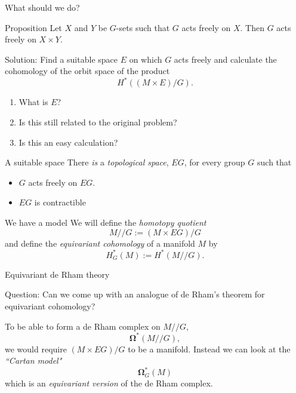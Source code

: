 \documentclass{beamer}
\newcommand{\omg}[1]{\boldsymbol{\Omega}^{#1}}
\begin{document}
\begin{frame}{What should we do?}
\begin{block}{Proposition}
 Let $X$ and $Y$ be $G$-sets such that $G$ acts freely on $X$. Then $G$ acts freely on $X \times Y$.
\end{block}
Solution: Find a { suitable space $E$} on which $G$ acts freely and calculate the cohomology of the orbit space of the product
\[
H^{*}((M\times E)/G).
\]
\begin{enumerate}
\item<3-> What is $E$?
\item<4-> Is this still related to the original problem?
\item<5-> Is this an easy calculation?
\end{enumerate}
\end{frame}

\begin{frame}{A suitable space}
There \emph{is} a \emph{topological space}, $EG$, for every group $G$ such that 
\begin{itemize}
\item $G$ acts freely on $EG$.
\item $EG$ is contractible
\end{itemize}
\end{frame}



\begin{frame}{We have a model}
We will define the \emph{homotopy quotient}
\[
M // G := (M \times EG) / G
\]
and define the \emph{equivariant cohomology} of a manifold $M$ by
\[
H^{*}_G(M) := H^{*}(M // G).
\]
\end{frame}



\begin{frame}{Equivariant de Rham theory}
\begin{block}{Question:}
Can we come up with an analogue of de Rham's theorem for equivariant cohomology? 
\end{block}
To be able to form a de Rham complex on $M//G$,
\[
\omg{*}(M//G),
\]
 we would require $(M \times EG)/G$ to be a manifold. Instead we can look at the \emph{``Cartan model"}
 \[
 \omg{*}_G(M)
 \]
 which is an \emph{equivariant version} of the de Rham complex.
\end{frame}
\end{document}
